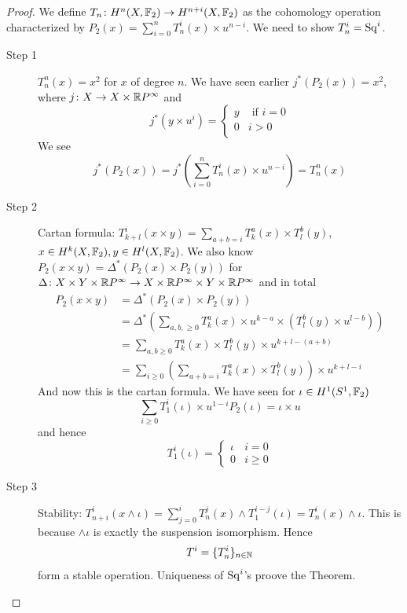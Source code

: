 \documentclass[language=english]{TemplateLecture}
\begin{document}
\begin{proof}
    We define \(T_n\colon H^n(X, \mathbb{F}_2) \to H^{n+i}(X, \mathbb{F}_2)\) as the cohomology operation characterized by \(P_2(x) = \sum_{i = 0}^n T_n^i(x)\times u^{n-i}\). We need to show \(T_n^i = \mathrm{Sq}^i\).

    \begin{description}
        \item[Step 1] \(T_n^n(x) = x^2\) for \(x\) of degree \(n\). We have seen earlier \(j^*(P_2(x)) = x^2\),  where \(j \colon X\to X\times \mathbb{R} P^\infty\) and
        \[j^*(y\times u^i) = \begin{cases}
            y & \text{ if } i = 0 \\
            0 & i > 0 \\
        \end{cases}\]
        We see
        \[j^*(P_2(x)) = j^*(\sum_{i = 0}^n T_n^i(x)\times u^{n-i}) = T^n_n(x)\]
        \item[Step 2] Cartan formula: \(T^i_{k+l}(x\times y) = \sum_{a+b = i} T_k^a(x)\times T_l^b(y)\), \(x \in H^k(X, \mathbb{F}_2), y \in H^l(X, \mathbb{F}_2)\).
        We also know \(P_2(x\times y) = \Delta^*(P_2(x)\times P_2(y))\) for \(\Delta\colon X\times Y \times \mathbb{R} P^\infty \to X\times \mathbb{R} P^\infty \times Y\times \mathbb{R} P^\infty\) and in total
        \[\begin{split}
            P_2(x\times y) &= \Delta^*(P_2(x)\times P_2(y)) \\
            &= \Delta^*(\sum_{a,b, \geq 0} T_k^a(x)\times u^{k-a}\times (T_l^b(y)\times u^{l-b})) \\
            &= \sum_{a, b \geq 0} T_k^a(x)\times T_l^b(y)\times u^{k+l-(a+b)} \\
            &= \sum_{i\geq 0} (\sum_{a+b = i} T^a_k(x)\times T_l^b(y))\times u^{k+l-i}
        \end{split}\]
        And now this is the cartan formula. We have seen for \(\iota\in H^1 (S^1, \mathbb{F}_2)\)
        \[\sum_{i\geq 0} T_1^i(\iota)\times u^{1-i} P_2(\iota) = \iota\times u\]
        and hence
        \[T_1^i(\iota) = \begin{cases}
            \iota & i = 0 \\
            0 & i\geq 0
        \end{cases}\]
        \item[Step 3] Stability: \(T_{n+i}^i(x\wedge \iota) = \sum_{j= 0}^i T_n^j(x)\wedge T_1^{i-j}(\iota) = T_n^i(x)\wedge \iota\). This is because \(\wedge \iota\) is exactly the suspension isomorphism. Hence
        \[T^i = \{T^i_n\}_{n\in \mathbb{N}}\]
        form a stable operation. Uniqueness of \(\mathrm{Sq}^i\)'s proove the Theorem.
    \end{description}
\end{proof}
\end{document}
